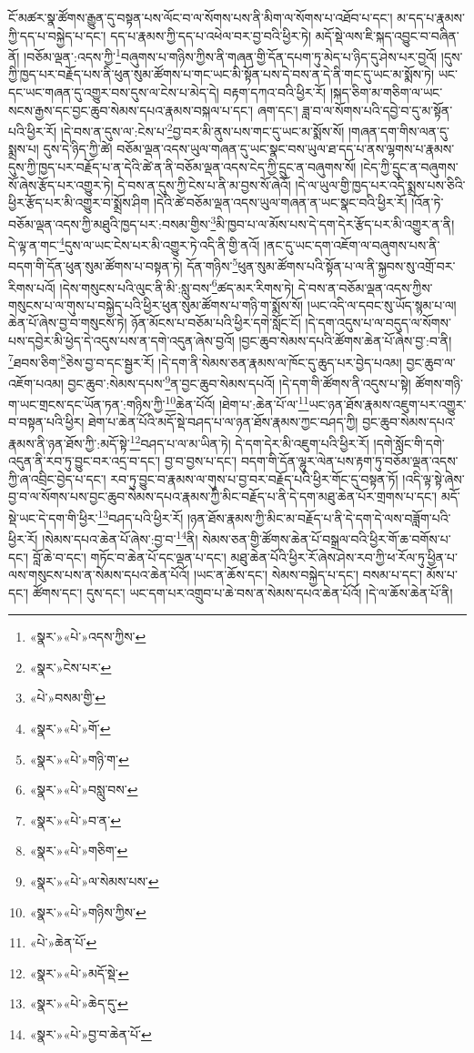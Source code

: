 ངོ་མཚར་སྣ་ཚོགས་རྒྱུན་དུ་བསྟན་པས་ལོང་བ་ལ་སོགས་པས་ནི་མིག་ལ་སོགས་པ་འཐོབ་པ་དང་། མ་དད་པ་རྣམས་ཀྱི་དད་པ་བསྐྱེད་པ་དང་། དད་པ་རྣམས་ཀྱི་དད་པ་འཕེལ་བར་བྱ་བའི་ཕྱིར་ཏེ། མདོ་སྡེ་ལས་ཇི་སྐད་འབྱུང་བ་བཞིན་ནོ། །བཅོམ་ལྡན་:འདས་ཀྱི་\footnote{«སྣར་»«པེ་»འདས་ཀྱིས་}བཞུགས་པ་གཉིས་ཀྱིས་ནི་གཞན་གྱི་དོན་དཔག་ཏུ་མེད་པ་ཉིད་དུ་ཤེས་པར་བྱའོ། །དུས་ཀྱི་ཁྱད་པར་བརྗོད་པས་ནི་ཕུན་སུམ་ཚོགས་པ་གང་ཡང་མི་སྟོན་པས་དེ་བས་ན་དེ་ནི་གང་དུ་ཡང་མ་སྨོས་ཏེ། ཡང་དང་ཡང་གཞན་དུ་འགྱུར་བས་དུས་ལ་ངེས་པ་མེད་དེ། བརྟག་དཀའ་བའི་ཕྱིར་རོ། །སྐད་ཅིག་མ་གཅིག་ལ་ཡང་སངས་རྒྱས་དང་བྱང་ཆུབ་སེམས་དཔའ་རྣམས་བསྐལ་པ་དང་། ཞག་དང་། ཟླ་བ་ལ་སོགས་པའི་དབྱེ་བ་དུ་མ་སྟོན་པའི་ཕྱིར་རོ། །དེ་བས་ན་དུས་ལ་:ངེས་པ་\footnote{«སྣར་»ངེས་པར་}བྱ་བར་མི་ནུས་པས་གང་དུ་ཡང་མ་སྨོས་སོ། །གཞན་དག་གིས་ལན་དུ་སྨྲས་པ། དུས་དེ་ཉིད་ཀྱི་ཚེ། བཅོམ་ལྡན་འདས་ཡུལ་གཞན་དུ་ཡང་སྣང་བས་ཡུལ་ཐ་དད་པ་ནས་ལྷགས་པ་རྣམས་དུས་ཀྱི་ཁྱད་པར་བརྗོད་པ་ན་དེའི་ཚེ་ན་ནི་བཅོམ་ལྡན་འདས་ངེད་ཀྱི་དྲུང་ན་བཞུགས་སོ། །ངེད་ཀྱི་དྲུང་ན་བཞུགས་སོ་ཞེས་རྩོད་པར་འགྱུར་ཏེ། དེ་བས་ན་དུས་ཀྱི་ངེས་པ་ནི་མ་བྱས་སོ་ཞེའོ། །དེ་ལ་ཡུལ་གྱི་ཁྱད་པར་འདི་སྨྲས་པས་ཅིའི་ཕྱིར་རྩོད་པར་མི་འགྱུར་བ་སྨྲོས་ཤིག །དེའི་ཚེ་བཅོམ་ལྡན་འདས་ཡུལ་གཞན་ན་ཡང་སྣང་བའི་ཕྱིར་རོ། །འོན་ཏེ་བཅོམ་ལྡན་འདས་ཀྱི་མཐུའི་ཁྱད་པར་:བསམ་གྱིས་\footnote{«པེ་»བསམ་གྱི་}མི་ཁྱབ་པ་ལ་མོས་པས་དེ་དག་དེར་རྩོད་པར་མི་འགྱུར་ན་ནི། དེ་ལྟ་ན་གང་\footnote{«སྣར་»«པེ་»གོ་}དུས་ལ་ཡང་ངེས་པར་མི་འགྱུར་ཏེ་འདི་ནི་གྱི་ནའོ། །ནང་དུ་ཡང་དག་འཇོག་ལ་བཞུགས་པས་ནི་བདག་གི་དོན་ཕུན་སུམ་ཚོགས་པ་བསྟན་ཏེ། དོན་གཉིས་\footnote{«སྣར་»«པེ་»གཉི་ག་}ཕུན་སུམ་ཚོགས་པའི་སྟོན་པ་ལ་ནི་སྐྱབས་སུ་འགྲོ་བར་རིགས་པའོ། །དེས་གསུངས་པའི་ལུང་ནི་མི་:སླུ་བས་\footnote{«སྣར་»«པེ་»བསླུ་བས་}ཚད་མར་རིགས་ཏེ། དེ་བས་ན་བཅོམ་ལྡན་འདས་ཀྱིས་གསུངས་པ་ལ་གུས་པ་བསྐྱེད་པའི་ཕྱིར་ཕུན་སུམ་ཚོགས་པ་གཉི་ག་སྨོས་སོ། །ཡང་འདི་ལ་དབང་སུ་ཡོད་སྙམ་པ་ལ། ཆེན་པོ་ཞེས་བྱ་བ་གསུངས་ཏེ། ཉོན་མོངས་པ་བཅོམ་པའི་ཕྱིར་དགེ་སློང་ངོ། །དེ་དག་འདུས་པ་ལ་བདུད་ལ་སོགས་པས་དབྱེར་མི་ཕྱེད་དེ་འདུས་པས་ན་དགེ་འདུན་ཞེས་བྱའོ། །བྱང་ཆུབ་སེམས་དཔའི་ཚོགས་ཆེན་པོ་ཞེས་བྱ་:བ་ནི། \footnote{«སྣར་»«པེ་»བ་ན་}ཐབས་ཅིག་\footnote{«སྣར་»«པེ་»གཅིག་}ཅེས་བྱ་བ་དང་སྦྱར་རོ། །དེ་དག་ནི་སེམས་ཅན་རྣམས་ལ་ཁོང་དུ་ཆུད་པར་བྱེད་པའམ། བྱང་ཆུབ་ལ་འཇོག་པའམ། བྱང་ཆུབ་:སེམས་དཔས་\footnote{«སྣར་»«པེ་»ལ་སེམས་པས་}ན་བྱང་ཆུབ་སེམས་དཔའོ། །དེ་དག་གི་ཚོགས་ནི་འདུས་པ་སྟེ། ཚོགས་གཉི་ག་ཡང་གྲངས་དང་ཡོན་ཏན་:གཉིས་ཀྱི་\footnote{«སྣར་»«པེ་»གཉིས་ཀྱིས་}ཆེན་པོའོ། །ཐེག་པ་:ཆེན་པོ་ལ་\footnote{«པེ་»ཆེན་པོ་}ཡང་ཉན་ཐོས་རྣམས་འཇུག་པར་འགྱུར་བ་བསྟན་པའི་ཕྱིར། ཐེག་པ་ཆེན་པོའི་མདོ་སྡེ་བཤད་པ་ལ་ཉན་ཐོས་རྣམས་ཀྱང་བཤད་ཀྱི། བྱང་ཆུབ་སེམས་དཔའ་རྣམས་ནི་ཉན་ཐོས་ཀྱི་:མདོ་སྟེ་\footnote{«སྣར་»«པེ་»མདོ་སྡེ་}བཤད་པ་ལ་མ་ཡིན་ཏེ། དེ་དག་དེར་མི་འཇུག་པའི་ཕྱིར་རོ། །དགེ་སློང་གི་དགེ་འདུན་ནི་རབ་ཏུ་བྱུང་བར་འདྲ་བ་དང་། བྱ་བ་བྱས་པ་དང་། བདག་གི་དོན་ལྷུར་ལེན་པས་རྟག་ཏུ་བཅོམ་ལྡན་འདས་ཀྱི་ཞ་འབྲིང་བྱེད་པ་དང་། རབ་ཏུ་བྱུང་བ་རྣམས་ལ་གུས་པ་བྱ་བར་བརྗོད་པའི་ཕྱིར་གོང་དུ་བསྟན་ཏོ། །འདི་ལྟ་སྟེ་ཞེས་བྱ་བ་ལ་སོགས་པས་བྱང་ཆུབ་སེམས་དཔའ་རྣམས་ཀྱི་མིང་བརྗོད་པ་ནི་དེ་དག་མཐུ་ཆེན་པོར་གྲགས་པ་དང་། མདོ་སྡེ་ཡང་དེ་དག་གི་ཕྱིར་\footnote{«སྣར་»«པེ་»ཆེད་དུ་}བཤད་པའི་ཕྱིར་རོ། །ཉན་ཐོས་རྣམས་ཀྱི་མིང་མ་བརྗོད་པ་ནི་དེ་དག་དེ་ལས་བཟློག་པའི་ཕྱིར་རོ། །སེམས་དཔའ་ཆེན་པོ་ཞེས་:བྱ་བ་\footnote{«སྣར་»«པེ་»བྱ་བ་ཆེན་པོ་}ནི། སེམས་ཅན་གྱི་ཚོགས་ཆེན་པོ་བསྒྲལ་བའི་ཕྱིར་གོ་ཆ་བགོས་པ་དང་། བློ་ཆེ་བ་དང་། གཏོང་བ་ཆེན་པོ་དང་ལྡན་པ་དང་། མཐུ་ཆེན་པོའི་ཕྱིར་རོ་ཞེས་ཤེས་རབ་ཀྱི་ཕ་རོལ་ཏུ་ཕྱིན་པ་ལས་གསུངས་པས་ན་སེམས་དཔའ་ཆེན་པོའོ། །ཡང་ན་ཆོས་དང་། སེམས་བསྐྱེད་པ་དང་། བསམ་པ་དང་། མོས་པ་དང་། ཚོགས་དང་། དུས་དང་། ཡང་དག་པར་འགྲུབ་པ་ཆེ་བས་ན་སེམས་དཔའ་ཆེན་པོའོ། །དེ་ལ་ཆོས་ཆེན་པོ་ནི། 